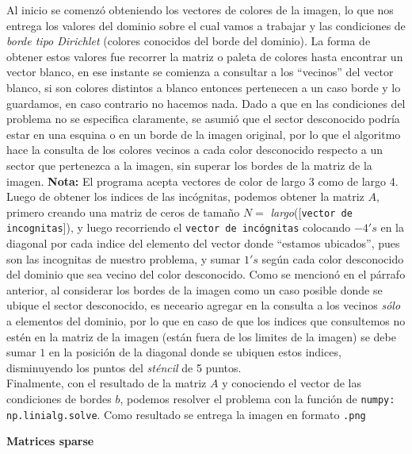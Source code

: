\documentclass[letterpaper,10.7pt]{article}
\begin{document}
Al inicio se comenzó obteniendo los vectores de colores de la imagen, lo que nos entrega los valores del dominio sobre el cual vamos a trabajar y las condiciones de \textit{borde tipo Dirichlet} (colores conocidos del borde del dominio). La forma de obtener estos valores fue recorrer la matriz o paleta de colores hasta encontrar un vector blanco, en ese instante se comienza a consultar a los ``vecinos'' del vector blanco, si son colores distintos a blanco entonces pertenecen a un caso borde y lo guardamos, en caso contrario no hacemos nada. Dado a que en las condiciones del problema no se especifica claramente, se asumió que el sector desconocido podría estar en una esquina o en un borde de la imagen original, por lo que el algoritmo hace la consulta de los colores vecinos a cada color desconocido respecto a un sector que pertenezca a la imagen, sin superar los bordes de la matriz de la imagen. 
\textbf{Nota:} El programa acepta vectores de color de largo 3 como de largo 4. \\

Luego de obtener los indices de las incógnitas, podemos obtener la matriz $A$, primero creando una matriz de ceros de tamaño $N =$ \textit{largo}([\texttt{vector de incognitas}]), y luego recorriendo el \texttt{vector de incógnitas} colocando $-4's$ en la diagonal por cada indice del elemento del vector donde ``estamos ubicados'', pues son las incognitas de nuestro problema, y sumar $1's$ según cada color desconocido del dominio que sea vecino del color desconocido. Como se mencionó en el párrafo anterior, al considerar los bordes de la imagen como un caso posible donde se ubique el sector desconocido, es neceario agregar en la consulta a los vecinos \textit{sólo} a elementos del dominio, por lo que en caso de que los indices que consultemos no estén en la matriz de la imagen (están fuera de los limites de la imagen) se debe sumar $1$ en la posición de la diagonal donde se ubiquen estos indices, disminuyendo los puntos del \textit{sténcil} de 5 puntos. \\

Finalmente, con el resultado de la matriz $A$ y conociendo el vector de las condiciones de bordes $b$, podemos resolver el problema con la función de \texttt{numpy:} \texttt{np.linialg.solve}. Como resultado se entrega la imagen en formato \texttt{.png}\\

\newpage

{\centering \textbf{{\Large Matrices sparse}}}\\
\end{document}
